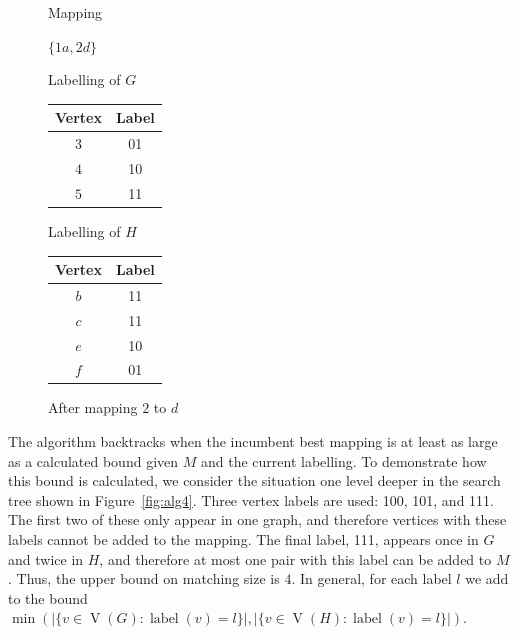 \documentclass[letterpaper]{article}
\DeclareMathOperator{\V}{V}
\DeclareMathOperator{\vtxlabel}{label}
\begin{document}
\begin{figure}[ht]
\centering
\begin{minipage}[t]{0.15\linewidth}
    Mapping

    \bigskip

    $\{1a, 2d\}$
\end{minipage}
\quad
\begin{minipage}[t]{0.3\linewidth}
    Labelling of $G$
    \begin{tabular}[t]{cc}
    \hline
        Vertex & Label\\
    \hline
        $3$ & 01 \\
        $4$ & 10 \\
        $5$ & 11 \\
    \hline
    \end{tabular}
\end{minipage}
\quad
\begin{minipage}[t]{0.3\linewidth}
    Labelling of $H$
    \begin{tabular}[t]{cc}
    \hline
        Vertex & Label\\
    \hline
        $b$ & 11 \\
        $c$ & 11 \\
        $e$ & 10 \\
        $f$ & 01 \\
    \hline
    \end{tabular}
\end{minipage}
\caption{After mapping $2$ to $d$}
\label{fig:alg3}
\end{figure}

The algorithm backtracks when the incumbent best mapping is at least as large
as a calculated bound given $M$ and the current labelling. To demonstrate how
this bound is calculated, we consider the situation one level deeper in the search
tree shown in Figure~\ref{fig:alg4}. Three vertex labels are used: 100, 101, and 111.
The first two of these only appear in one graph, and therefore vertices with these
labels cannot be added to the mapping. The final label, 111, appears once in $G$ and
twice in $H$, and therefore at most one pair with this label can be added to $M$.
Thus, the upper bound on matching size is $4$. In general, for each label $l$
we add to the bound $\min(|\{ v \in \V(G) : \vtxlabel(v)=l\}|,
|\{ v \in \V(H) : \vtxlabel(v)=l \}|)$.
\end{document}
